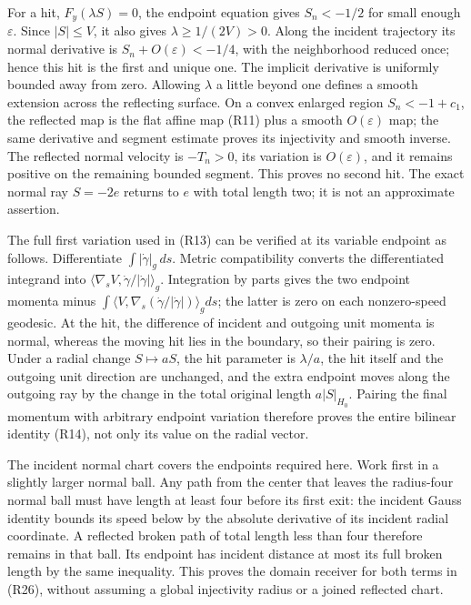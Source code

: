 \documentclass[
  11pt,
]{article}
\begin{document}
For a hit, \(F_y(\lambda S)=0\), the endpoint equation gives
\(S_n<-1/2\) for small enough \(\varepsilon\). Since \(|S|\leq V\), it
also gives \(\lambda\geq1/(2V)>0\). Along the incident trajectory its
normal derivative is \(S_n+O(\varepsilon)<-1/4\), with the neighborhood
reduced once; hence this hit is the first and unique one. The implicit
derivative is uniformly bounded away from zero. Allowing \(\lambda\) a
little beyond one defines a smooth extension across the reflecting
surface. On a convex enlarged region \(S_n<-1+c_1\), the reflected map
is the flat affine map (R11) plus a smooth \(O(\varepsilon)\) map; the
same derivative and segment estimate proves its injectivity and smooth
inverse. The reflected normal velocity is \(-T_n>0\), its variation is
\(O(\varepsilon)\), and it remains positive on the remaining bounded
segment. This proves no second hit. The exact normal ray \(S=-2e\)
returns to \(e\) with total length two; it is not an approximate
assertion.

The full first variation used in (R13) can be verified at its variable
endpoint as follows. Differentiate \(\int|\dot\gamma|_g\,ds\). Metric
compatibility converts the differentiated integrand into
\(\langle\nabla_sV,\dot\gamma/|\dot\gamma|\rangle_g\). Integration by
parts gives the two endpoint momenta minus
\(\int\langle V,\nabla_s(\dot\gamma/|\dot\gamma|)\rangle_gds\); the
latter is zero on each nonzero-speed geodesic. At the hit, the
difference of incident and outgoing unit momenta is normal, whereas the
moving hit lies in the boundary, so their pairing is zero. Under a
radial change \(S\mapsto aS\), the hit parameter is \(\lambda/a\), the
hit itself and the outgoing unit direction are unchanged, and the extra
endpoint moves along the outgoing ray by the change in the total
original length \(a|S|_{H_0}\). Pairing the final momentum with
arbitrary endpoint variation therefore proves the entire bilinear
identity (R14), not only its value on the radial vector.

The incident normal chart covers the endpoints required here. Work first
in a slightly larger normal ball. Any path from the center that leaves
the radius-four normal ball must have length at least four before its
first exit: the incident Gauss identity bounds its speed below by the
absolute derivative of its incident radial coordinate. A reflected
broken path of total length less than four therefore remains in that
ball. Its endpoint has incident distance at most its full broken length
by the same inequality. This proves the domain receiver for both terms
in (R26), without assuming a global injectivity radius or a joined
reflected chart.
\end{document}

